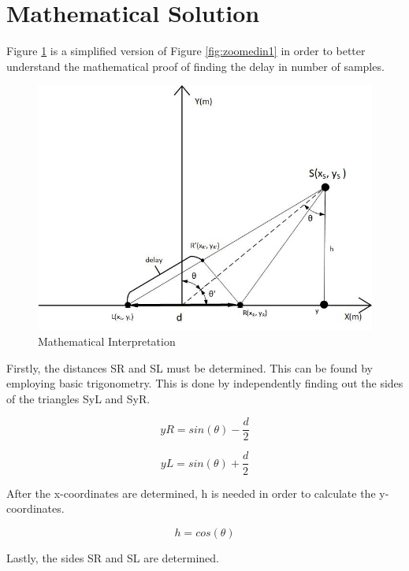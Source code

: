 \newpage
\section{Mathematical Solution}

Figure \ref{fig:zoomedin2} is a simplified version of Figure \ref{fig:zoomedin1} in order to better
understand the mathematical proof of finding the delay in number of samples.
\begin{figure}[htp]
	\centering
	\includegraphics[width=1\textwidth]{Illustrations/mathematicalShit.jpg}
	\caption{Mathematical Interpretation}
	\label{fig:zoomedin2}
\end{figure}

Firstly, the distances SR and SL must be determined. This can be found by employing 
basic trigonometry. This is done by independently finding out the sides of the triangles
SyL  and SyR.

\begin{equation}
	yR = sin(\theta) - \dfrac{d}{2} 
\end{equation}

\begin{equation}
	yL = sin(\theta) + \dfrac{d}{2}
\end{equation}

After the x-coordinates are determined, h is needed in order to calculate the y-coordinates.

\begin{equation}
	h = cos(\theta)
\end{equation}

\newpage
Lastly, the sides SR and SL are determined.

